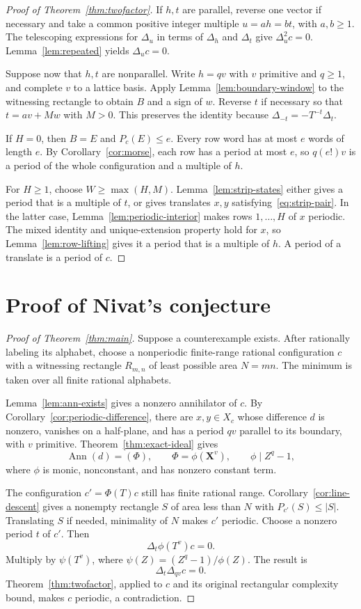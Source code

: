\documentclass[11pt,a4paper,reqno]{amsart}
\theoremstyle{remark}
\newcommand{\mon}[1]{\boldsymbol X^{#1}}
\newcommand{\De}{\Delta}
\DeclareMathOperator{\Ann}{Ann}
\numberwithin{equation}{section}
\begin{document}
\begin{proof}[Proof of Theorem~\ref{thm:twofactor}]
If $h,t$ are parallel, reverse one vector if necessary and take a common positive integer multiple $u=ah=bt$, with $a,b\ge1$. The telescoping expressions for $\De_u$ in terms of $\De_h$ and $\De_t$ give $\De_u^2c=0$. Lemma~\ref{lem:repeated} yields $\De_uc=0$.

Suppose now that $h,t$ are nonparallel. Write $h=qv$ with $v$ primitive and $q\ge1$, and complete $v$ to a lattice basis. Apply Lemma~\ref{lem:boundary-window} to the witnessing rectangle to obtain $B$ and a sign of $w$. Reverse $t$ if necessary so that $t=av+Mw$ with $M>0$. This preserves the identity because $\De_{-t}=-T^{-t}\De_t$.

If $H=0$, then $B=E$ and $P_c(E)\le e$. Every row word has at most $e$ words of length $e$. By Corollary~\ref{cor:morse}, each row has a period at most $e$, so $q(e!)v$ is a period of the whole configuration and a multiple of $h$.

For $H\ge1$, choose $W\ge\max(H,M)$. Lemma~\ref{lem:strip-states} either gives a period that is a multiple of $t$, or gives translates $x,y$ satisfying~\eqref{eq:strip-pair}. In the latter case, Lemma~\ref{lem:periodic-interior} makes rows $1,\ldots,H$ of $x$ periodic. The mixed identity and unique-extension property hold for $x$, so Lemma~\ref{lem:row-lifting} gives it a period that is a multiple of $h$. A period of a translate is a period of $c$.
\end{proof}

\section{Proof of Nivat's conjecture}\label{sec:completion}
\begin{proof}[Proof of Theorem~\ref{thm:main}]
Suppose a counterexample exists. After rationally labeling its alphabet, choose a nonperiodic finite-range rational configuration $c$ with a witnessing rectangle $R_{m,n}$ of least possible area $N=mn$. The minimum is taken over all finite rational alphabets.

Lemma~\ref{lem:ann-exists} gives a nonzero annihilator of $c$. By Corollary~\ref{cor:periodic-difference}, there are $x,y\in X_c$ whose difference $d$ is nonzero, vanishes on a half-plane, and has a period $qv$ parallel to its boundary, with $v$ primitive. Theorem~\ref{thm:exact-ideal} gives
\[
 \Ann(d)=(\Phi),\qquad
 \Phi=\phi(\mon v),\qquad \phi\mid Z^q-1,
\]
where $\phi$ is monic, nonconstant, and has nonzero constant term.

The configuration $c'=\Phi(T)c$ still has finite rational range. Corollary~\ref{cor:line-descent} gives a nonempty rectangle $S$ of area less than $N$ with $P_{c'}(S)\le|S|$. Translating $S$ if needed, minimality of $N$ makes $c'$ periodic. Choose a nonzero period $t$ of $c'$. Then
\[
 \De_t\phi(T^v)c=0.
\]
Multiply by $\psi(T^v)$, where $\psi(Z)=(Z^q-1)/\phi(Z)$. The result is
\[
 \De_t\De_{qv}c=0.
\]
Theorem~\ref{thm:twofactor}, applied to $c$ and its original rectangular complexity bound, makes $c$ periodic, a contradiction.
\end{proof}
\end{document}
